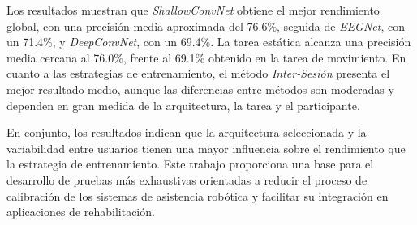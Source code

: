 Los resultados muestran que \textit{ShallowConvNet} obtiene el mejor rendimiento global, con una precisión media aproximada del 76.6\%, seguida de \textit{EEGNet}, con un 71.4\%, y \textit{DeepConvNet}, con un 69.4\%. La tarea estática alcanza una precisión media cercana al 76.0\%, frente al 69.1\% obtenido en la tarea de movimiento. En cuanto a las estrategias de entrenamiento, el método \textit{Inter-Sesión} presenta el mejor resultado medio, aunque las diferencias entre métodos son moderadas y dependen en gran medida de la arquitectura, la tarea y el participante.

En conjunto, los resultados indican que la arquitectura seleccionada y la variabilidad entre usuarios tienen una mayor influencia sobre el rendimiento que la estrategia de entrenamiento. Este trabajo proporciona una base para el desarrollo de pruebas más exhaustivas orientadas a reducir el proceso de calibración de los sistemas de asistencia robótica y facilitar su integración en aplicaciones de rehabilitación.



\afterpage{\blankpage} %

